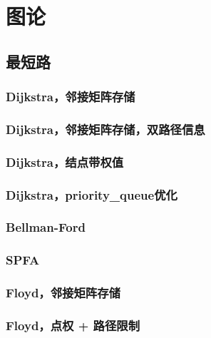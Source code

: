 
\chapter{图论}
\label{graph_theory}



\section{最短路}

\subsection{Dijkstra，邻接矩阵存储}



\subsection{Dijkstra，邻接矩阵存储，双路径信息}


\subsection{Dijkstra，结点带权值}


\subsection{Dijkstra，priority\_queue优化}


\subsection{Bellman-Ford}


\subsection{SPFA}


\subsection{Floyd，邻接矩阵存储}


\subsection{Floyd，点权 + 路径限制}



